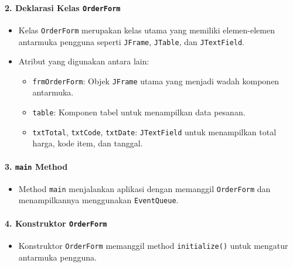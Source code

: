 \paragraph{2. Deklarasi Kelas \texttt{OrderForm}}
\begin{itemize}
	\item Kelas \texttt{OrderForm} merupakan kelas utama yang memiliki elemen-elemen antarmuka pengguna seperti \texttt{JFrame}, \texttt{JTable}, dan \texttt{JTextField}.
	\item Atribut yang digunakan antara lain:
	\begin{itemize}
		\item \texttt{frmOrderForm}: Objek \texttt{JFrame} utama yang menjadi wadah komponen antarmuka.
		\item \texttt{table}: Komponen tabel untuk menampilkan data pesanan.
		\item \texttt{txtTotal}, \texttt{txtCode}, \texttt{txtDate}: \texttt{JTextField} untuk menampilkan total harga, kode item, dan tanggal.
	\end{itemize}
\end{itemize}

\paragraph{3. \texttt{main} Method}
\begin{itemize}
	\item Method \texttt{main} menjalankan aplikasi dengan memanggil \texttt{OrderForm} dan menampilkannya menggunakan \texttt{EventQueue}.
\end{itemize}

\paragraph{4. Konstruktor \texttt{OrderForm}}
\begin{itemize}
	\item Konstruktor \texttt{OrderForm} memanggil method \texttt{initialize()} untuk mengatur antarmuka pengguna.
\end{itemize}

